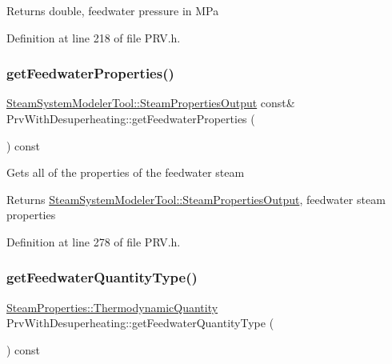 \begin{DoxyReturn}{Returns}
double, feedwater pressure in M\+Pa 
\end{DoxyReturn}


Definition at line 218 of file P\+R\+V.\+h.

\mbox{\label{class_prv_with_desuperheating_a8f4594109bda9bc4030c23cee9841fa8}} 
\subsubsection{\texorpdfstring{get\+Feedwater\+Properties()}{getFeedwaterProperties()}}
{\footnotesize\ttfamily \hyperlink{struct_steam_system_modeler_tool_1_1_steam_properties_output}{Steam\+System\+Modeler\+Tool\+::\+Steam\+Properties\+Output} const\& Prv\+With\+Desuperheating\+::get\+Feedwater\+Properties (\begin{DoxyParamCaption}{ }\end{DoxyParamCaption}) const\hspace{0.3cm}{\ttfamily [inline]}}

Gets all of the properties of the feedwater steam \begin{DoxyReturn}{Returns}
\hyperlink{struct_steam_system_modeler_tool_1_1_steam_properties_output}{Steam\+System\+Modeler\+Tool\+::\+Steam\+Properties\+Output}, feedwater steam properties 
\end{DoxyReturn}


Definition at line 278 of file P\+R\+V.\+h.

\mbox{\label{class_prv_with_desuperheating_aa6901e00ecf819d95f79c20ef1775876}} 
\subsubsection{\texorpdfstring{get\+Feedwater\+Quantity\+Type()}{getFeedwaterQuantityType()}}
{\footnotesize\ttfamily \hyperlink{class_steam_properties_ae0294bedf7d178c2d8fb6aed0f62fbff}{Steam\+Properties\+::\+Thermodynamic\+Quantity} Prv\+With\+Desuperheating\+::get\+Feedwater\+Quantity\+Type (\begin{DoxyParamCaption}{ }\end{DoxyParamCaption}) const\hspace{0.3cm}{\ttfamily [inline]}}

